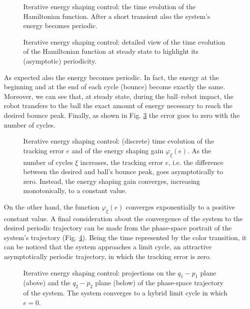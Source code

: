 %
\begin{figure}[!ht]
	\centering
	\caption{Iterative energy shaping control: the time evolution of the Hamiltonian function. After a short transient also the system's energy becomes periodic.}
	\label{fig:ctrl4}
\end{figure}
%
\begin{figure}[!ht]
	\centering
	\caption{Iterative energy shaping control: detailed view of the time evolution of the Hamiltonian function at steady state to highlight its (asymptotic) periodicity.}
	\label{fig:ctrl4_det}
\end{figure}
%
As expected also the energy becomes periodic. In fact, the energy at the beginning and at the end of each cycle (bounce) become exactly the same. Moreover, we can see that, at steady state, during the ball--robot impact, the robot transfers to the ball the exact amount of energy necessary to reach the desired bounce peak. Finally, as shown in Fig. \ref{fig:ctrl5} the error goes to zero with the number of cycles.
%
\begin{figure}[!ht]
	\centering
	\caption{Iterative energy shaping control: (discrete) time evolution of the tracking error $e$ and of the energy shaping gain $\varphi_\xi(e)$. As the number of cycles $\xi$ increases, the tracking error $e$, i.e. the difference between the desired and ball's bounce peak, goes asymptotically to zero. Instead, the energy shaping gain converges, increasing monotonically, to a constant value.}
	\label{fig:ctrl5}
\end{figure}
%
On the other hand, the function $\varphi_\xi(e)$ converges exponentially to a positive constant value. 
%
A final consideration about the convergence of the system to the desired periodic trajectory can be made from the phase-space portrait of the system's trajectory (Fig. \ref{fig:ctrl2}). Being the time represented by the color transition, it can be noticed that the system approaches a limit cycle, an attractive asymptotically periodic trajectory, in which the tracking error is zero.
%
%
\begin{figure}[!ht]
	\centering
	\caption[Iterative energy shaping control: phase--space trajectories]{Iterative energy shaping control: projections on the $q_1-p_1$ plane (above) and the $q_2-p_2$ plane (below) of the phase-space trajectory of the system. The system converges to a hybrid limit cycle in which $e=0$.}
	\label{fig:ctrl2}
\end{figure}
%
\clearpage
%
